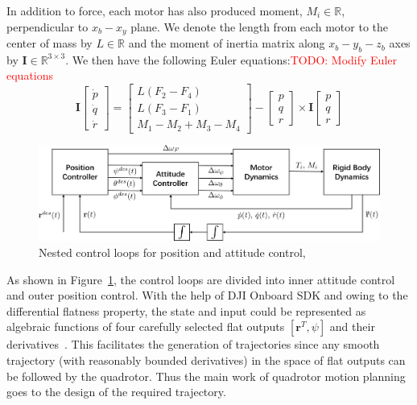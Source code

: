 In addition to force, each motor has also produced moment, $\mathit{M_i}\in\mathbb{R}$, perpendicular to $x_b-x_y$ plane. We denote the length from each motor to the center of mass by $\mathit{L}\in\mathbb{R}$ and the moment of inertia matrix along $x_b-y_b-z_b$ axes by $\mathbf{I}\in\mathbb{R}^{3\times3}$. We then have the following Euler equations:\textcolor{red}{TODO: Modify Euler equations}
\begin{equation}\label{eq:euler}
\mathbf{I}\begin{bmatrix}\dot{p}\\\dot{q}\\\dot{r}\end{bmatrix}=\begin{bmatrix}L(F_2-F_4)\\L(F_3-F_1)\\M_1-M_2+M_3-M_4\end{bmatrix}-\begin{bmatrix}p\\q\\r\end{bmatrix}\times
\mathbf{I}\begin{bmatrix}p\\q\\r\end{bmatrix}
\end{equation}

\begin{figure}[htb]
  \centering
  \includegraphics[width=1.0\textwidth]{figure/chapter_2/nest.png}
  \caption{Nested control loops for position and attitude control,~\cite{GRASP}}
  \label{fig:nest}
\end{figure}

As shown in Figure~\ref{fig:nest}, the control loops are divided into inner attitude control and outer position control. With the help of DJI Onboard SDK and owing to the differential flatness property, the state and input could be represented as algebraic functions of four carefully selected flat outputs $[\mathbf{r}^T, \psi]$ and their derivatives~\cite{Snap}. This facilitates the generation of trajectories since any smooth trajectory (with reasonably bounded derivatives) in the space of flat outputs can be followed by the quadrotor. Thus the main work of quadrotor motion planning goes to the design of the required trajectory.


